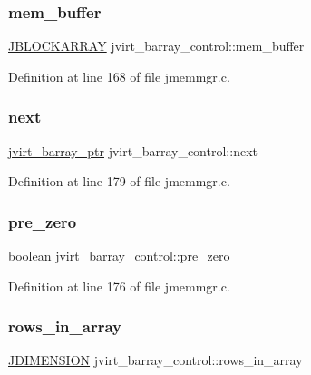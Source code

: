 \subsubsection{\texorpdfstring{mem\_buffer}{mem\_buffer}}
{\footnotesize\ttfamily \mbox{\hyperlink{jpeglib_8h_ab03cfeb937b60b9b73ca6e3cf935af49}{J\+B\+L\+O\+C\+K\+A\+R\+R\+AY}} jvirt\+\_\+barray\+\_\+control\+::mem\+\_\+buffer}



Definition at line 168 of file jmemmgr.\+c.

\mbox{\label{structjvirt__barray__control_ae4b8dea777dcac10f1de982f0bedac0e}} 
\subsubsection{\texorpdfstring{next}{next}}
{\footnotesize\ttfamily \mbox{\hyperlink{jpeglib_8h_a994f4cba141d82ded90af38e51223f0b}{jvirt\+\_\+barray\+\_\+ptr}} jvirt\+\_\+barray\+\_\+control\+::next}



Definition at line 179 of file jmemmgr.\+c.

\mbox{\label{structjvirt__barray__control_a40d3b399333a4d0468c7fcb4465e4cdd}} 
\subsubsection{\texorpdfstring{pre\_zero}{pre\_zero}}
{\footnotesize\ttfamily \mbox{\hyperlink{jmorecfg_8h_a7c6368b321bd9acd0149b030bb8275ed}{boolean}} jvirt\+\_\+barray\+\_\+control\+::pre\+\_\+zero}



Definition at line 176 of file jmemmgr.\+c.

\mbox{\label{structjvirt__barray__control_a57c1bf0ff557df3e1e0926e367a6b635}} 
\subsubsection{\texorpdfstring{rows\_in\_array}{rows\_in\_array}}
{\footnotesize\ttfamily \mbox{\hyperlink{jmorecfg_8h_a04ed4674f6f1d0d50ec241531e38274f}{J\+D\+I\+M\+E\+N\+S\+I\+ON}} jvirt\+\_\+barray\+\_\+control\+::rows\+\_\+in\+\_\+array}



